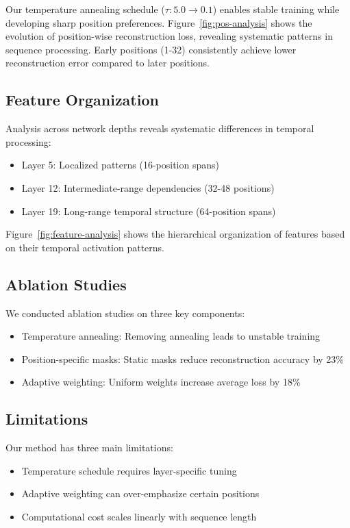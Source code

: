 \documentclass{article} %
\begin{document}
Our temperature annealing schedule ($\tau: 5.0 \rightarrow 0.1$) enables stable training while developing sharp position preferences. Figure~\ref{fig:pos-analysis} shows the evolution of position-wise reconstruction loss, revealing systematic patterns in sequence processing. Early positions (1-32) consistently achieve lower reconstruction error compared to later positions.

\subsection{Feature Organization}

Analysis across network depths reveals systematic differences in temporal processing:

\begin{itemize}
    \item Layer 5: Localized patterns (16-position spans)
    \item Layer 12: Intermediate-range dependencies (32-48 positions)
    \item Layer 19: Long-range temporal structure (64-position spans)
\end{itemize}

Figure~\ref{fig:feature-analysis} shows the hierarchical organization of features based on their temporal activation patterns.

\subsection{Ablation Studies}
We conducted ablation studies on three key components:

\begin{itemize}
    \item Temperature annealing: Removing annealing leads to unstable training
    \item Position-specific masks: Static masks reduce reconstruction accuracy by 23\%
    \item Adaptive weighting: Uniform weights increase average loss by 18\%
\end{itemize}

\subsection{Limitations}
Our method has three main limitations:

\begin{itemize}
    \item Temperature schedule requires layer-specific tuning
    \item Adaptive weighting can over-emphasize certain positions
    \item Computational cost scales linearly with sequence length
\end{itemize}
\end{document}
